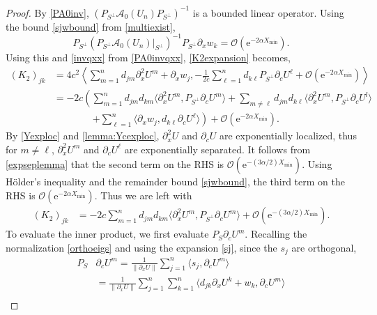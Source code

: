 \documentclass[review,onefignum,onetabnum]{siamart171218}
\newcommand{\rme}{\mathrm{e}}
\newcommand{\calA}{\mathcal{A}}
\newcommand{\vK}{\bm{\mathit{K}}}
\begin{document}
\begin{proof}
By \cref{PA0inv}, $(P_{S^\perp} \calA_0(U_n)P_{S^\perp})^{-1}$ is a bounded linear operator. Using the bound \cref{sjwbound} from \cref{multiexist},
\[
P_{S^\perp} (P_{S^\perp} \calA_0(U_n)|_{S^\perp})^{-1} P_{S^\perp}\partial_xw_k = \mathcal{O}(\rme^{-2 \alpha X_{\mathrm{min}}}).
\]
Using this and \cref{invqxx} from \cref{PA0invqxx}, \cref{K2expansion} becomes,
\[
\begin{aligned}
(\vK_2)_{jk}
&= 4 c^2 \left\langle \sum_{m = 1}^{n} d_{jm}\partial_x^2U^m + \partial_xw_j,
-\frac{1}{2c}\sum_{\ell = 1}^{n} d_{k\ell} P_{S^\perp}\partial_cU^\ell + \mathcal{O}(\rme^{-2 \alpha X_{\mathrm{min}}}) \right\rangle \\
&= -2 c \left( \sum_{m = 1}^{n} d_{jm} d_{km} \langle \partial_x^2U^m, P_{S^\perp} \partial_cU^m \rangle
+ \sum_{m\neq \ell} d_{jm} d_{k\ell} \langle \partial_x^2U^m, P_{S^\perp} \partial_cU^l \rangle\right.\\
&\qquad\qquad\left.+ \sum_{\ell=1}^n \langle \partial_xw_j, d_{k\ell}\partial_cU^\ell \rangle \right)
 + \mathcal{O}(\rme^{-2 \alpha X_{\mathrm{min}}}).
\end{aligned}
\]
By \cref{Yexploc} and \cref{lemma:Ycexploc}, $\partial_x^2 U$ and $\partial_c U$ are exponentially localized, thus for $m\neq\ell$, $\partial_x^2U^m$ and $\partial_cU^\ell$ are exponentially separated. It follows from \cref{expseplemma} that the second term on the RHS is $\mathcal{O}(\rme^{-(3 \alpha/2) X_{\mathrm{min}}})$.
Using H\"{o}lder's inequality and the remainder bound \cref{sjwbound}, the third term on the RHS is $\mathcal{O}(\rme^{-2 \alpha X_{\mathrm{min}}})$. Thus we are left with
\begin{equation}\label{K2step1}
\begin{aligned}
(\vK_2)_{jk}
&= -2 c \sum_{m = 1}^{n} d_{jm} d_{km} \langle \partial_x^2U^m, P_{S^\perp} \partial_cU^m \rangle + \mathcal{O}(\rme^{-(3 \alpha/2) X_{\mathrm{min}}}).
\end{aligned}
\end{equation}
To evaluate the inner product, we first evaluate $P_S \partial_c U^m$. Recalling the normalization \cref{orthoeigs} and using the expansion \cref{sj}, since the $s_j$ are orthogonal,
\[
\begin{aligned}
P_S &\partial_c U^m = \frac{1}{\|\partial_x U\|} \sum_{j=1}^n \langle s_j, \partial_c U^m \rangle \\
&= \frac{1}{\|\partial_x U\|} \sum_{j=1}^n \sum_{k=1}^n \langle d_{jk} \partial_x U^k + w_k, \partial_c U^m \rangle \\

\end{aligned}\]
\end{proof}
\end{document}
